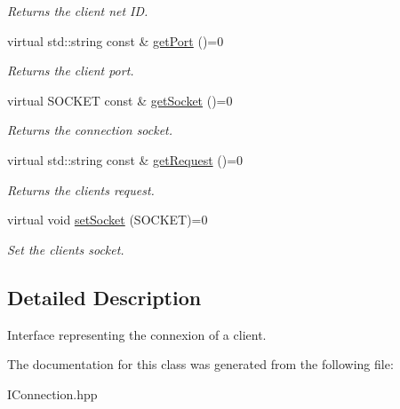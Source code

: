 \begin{DoxyCompactItemize}
\begin{DoxyCompactList}\small\item\em Returns the client net I\+D. \end{DoxyCompactList}\item 
\hypertarget{class_i_connection_a7e1faa59d9ae7c6bc53bb491e5afd7e2}{}virtual std\+::string const \& \hyperlink{class_i_connection_a7e1faa59d9ae7c6bc53bb491e5afd7e2}{get\+Port} ()=0\label{class_i_connection_a7e1faa59d9ae7c6bc53bb491e5afd7e2}

\begin{DoxyCompactList}\small\item\em Returns the client port. \end{DoxyCompactList}\item 
\hypertarget{class_i_connection_a09349b5ba8ce8e381cf34ab12ba40c9c}{}virtual S\+O\+C\+K\+E\+T const \& \hyperlink{class_i_connection_a09349b5ba8ce8e381cf34ab12ba40c9c}{get\+Socket} ()=0\label{class_i_connection_a09349b5ba8ce8e381cf34ab12ba40c9c}

\begin{DoxyCompactList}\small\item\em Returns the connection socket. \end{DoxyCompactList}\item 
\hypertarget{class_i_connection_a78d5be69e5e26c7645b04a1903b1557d}{}virtual std\+::string const \& \hyperlink{class_i_connection_a78d5be69e5e26c7645b04a1903b1557d}{get\+Request} ()=0\label{class_i_connection_a78d5be69e5e26c7645b04a1903b1557d}

\begin{DoxyCompactList}\small\item\em Returns the client\textquotesingle{}s request. \end{DoxyCompactList}\item 
\hypertarget{class_i_connection_a7efb00e9c99e0eac30f5005aca9ed571}{}virtual void \hyperlink{class_i_connection_a7efb00e9c99e0eac30f5005aca9ed571}{set\+Socket} (S\+O\+C\+K\+E\+T)=0\label{class_i_connection_a7efb00e9c99e0eac30f5005aca9ed571}

\begin{DoxyCompactList}\small\item\em Set the client\textquotesingle{}s socket. \end{DoxyCompactList}\end{DoxyCompactItemize}


\subsection{Detailed Description}
Interface representing the connexion of a client. 

The documentation for this class was generated from the following file\+:\begin{DoxyCompactItemize}
\item 
I\+Connection.\+hpp\end{DoxyCompactItemize}
